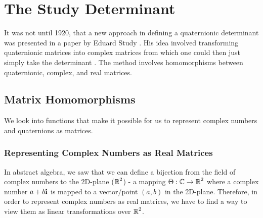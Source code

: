 \begin{lemma}

\end{lemma}

\begin{lemma}

\end{lemma}

\begin{theorem}

\end{theorem}

\section{The Study Determinant}

It was not until 1920, that a new approach in defining a quaternionic determinant was presented in a paper by Eduard Study \cite{aslaksen}. His idea involved transforming quaternionic matrices into complex matrices from which one could then just simply take the determinant \cite{aslaksen}. The method involves homomorphisms between quaternionic, complex, and real matrices.

\subsection{Matrix Homomorphisms}

We look into functions that make it possible for us to represent complex numbers and quaternions as matrices. 
\iffalse
\subsubsection{Representing Complex Numbers as Real Matrices}

In abstract algebra, we saw that we can define a bijection from the field of complex numbers to the 2D-plane ($\operatorname{\mathbb{R}}^2$) - a mapping $\Theta : \operatorname{\mathbb{C}} \rightarrow \operatorname{\mathbb{R}}^2$ where a complex number $a+b\textbf{i}$ is mapped to a vector/point $(a,b)$ in the 2D-plane. Therefore, in order to represent complex numbers as real matrices, we have to find a way to view them as linear transformations over $\operatorname{\mathbb{R}}^2$. 


